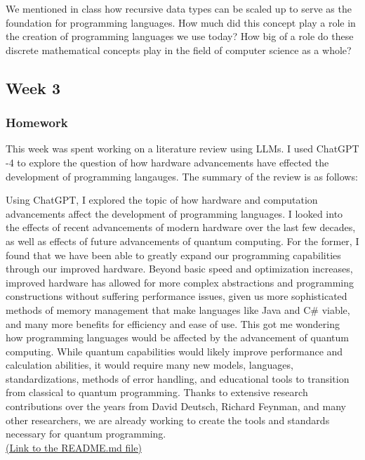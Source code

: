 \documentclass{article}
\theoremstyle{theorem}
\theoremstyle{definition}
\theoremstyle{remark}
\begin{document}
\hspace{0.65cm}We mentioned in class how recursive data types can be scaled up to serve as the 
foundation for programming languages. 
How much did this concept play a role in the creation of programming languages we use today? How big of a role do these discrete mathematical concepts
play in the field of computer science as a whole?


\subsection{Week 3}

\subsubsection{Homework}

This week was spent working on a literature review using LLMs. I used ChatGPT -4 to explore the question of how hardware advancements have effected the development of programming langauges. The summary of the review is as follows:


\hspace{0.65cm}Using ChatGPT, I explored the topic of how hardware and computation advancements affect the development of programming languages.
I looked into the effects of recent advancements of modern hardware over the last few decades, as well as effects of future advancements of
quantum computing. 
For the former, I found that we have been able to 
greatly expand our programming capabilities through our improved hardware. 
Beyond basic speed and optimization increases, improved hardware has allowed 
for more complex abstractions and programming constructions without suffering 
performance issues, given us more sophisticated methods of memory management that
 make languages like Java and C\# viable, and many more benefits for efficiency and ease 
 of use. This got me wondering how programming languages would be affected by the advancement
  of quantum computing. While quantum capabilities would likely improve performance and
   calculation abilities, it  would require many new models, languages, standardizations, 
   methods of error handling, and educational tools to transition from classical to quantum 
   programming. Thanks to extensive research contributions over the years from David Deutsch,
    Richard Feynman, and many other researchers, we are already working to create the tools and
     standards necessary for quantum programming.\\
     \href{https://github.com/likoyan727/LitReview/blob/main/README.md}{(Link to the README.md file)}
\end{document}
